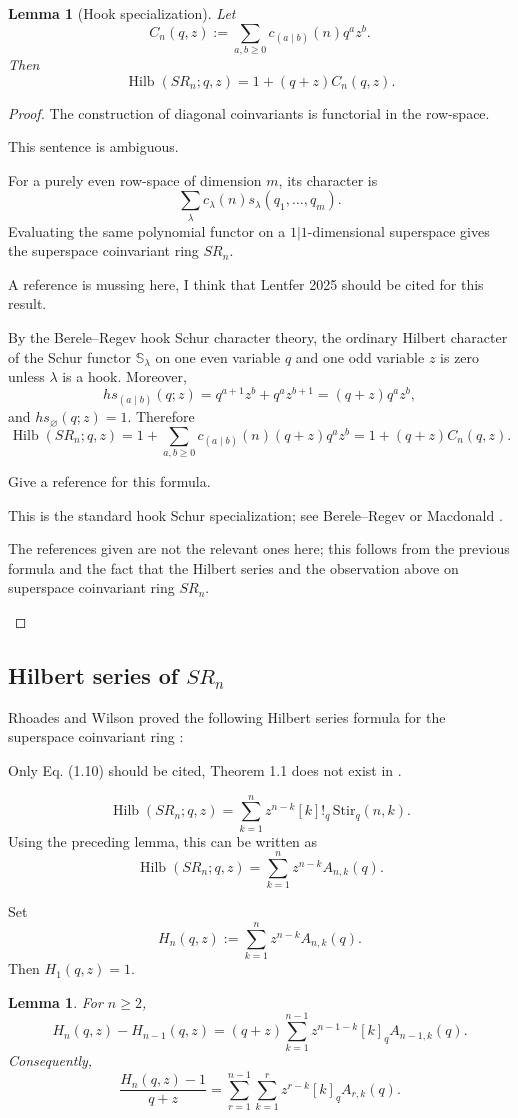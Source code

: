 \documentclass[12pt]{article}
\newtheorem{lemma}[theorem]{Lemma}
\DeclareMathOperator{\Hilb}{Hilb}
\newcommand{\review}[1]{\begin{reviewbox}#1\end{reviewbox}}
\begin{document}
\begin{lemma}[Hook specialization]
Let
\[
C_n(q,z):=\sum_{a,b\geq 0} c_{(a\mid b)}(n)q^a z^b.
\]
Then
\[
\Hilb(SR_n;q,z)=1+(q+z)C_n(q,z).
\]
\end{lemma}

\begin{proof}
The construction of diagonal coinvariants is functorial in the row-space. 
\review{This sentence is ambiguous.}
For a
purely even row-space of dimension \(m\), its character is
\[
\sum_\lambda c_\lambda(n)s_\lambda(q_1,\dots,q_m).
\]
Evaluating the same polynomial functor on a \(1|1\)-dimensional superspace gives
the superspace coinvariant ring \(SR_n\). 
\review{A reference is mussing here, I think that Lentfer 2025 should be cited for this result.}
By the Berele--Regev hook Schur
character theory, the ordinary Hilbert character of the Schur functor
\(\mathbb S_\lambda\) on one even variable \(q\) and one odd variable \(z\) is zero
unless \(\lambda\) is a hook. Moreover,
\[
hs_{(a\mid b)}(q;z)=q^{a+1}z^b+q^a z^{b+1}=(q+z)q^a z^b,
\]
and \(hs_\varnothing(q;z)=1\). Therefore
\[
\Hilb(SR_n;q,z)
=
1+\sum_{a,b\geq 0}c_{(a\mid b)}(n)(q+z)q^a z^b
=
1+(q+z)C_n(q,z).
\]
\review{Give a reference for this formula.}
This is the standard hook Schur specialization; see Berele--Regev
\cite{BereleRegev} or Macdonald \cite[Ch.~I, \S3, Ex.~23]{Macdonald}.
\review{The references given are not the relevant ones here; this follows from the previous formula and the fact that the Hilbert series and the observation above on superspace coinvariant ring $SR_n$.}
\end{proof}

\subsection{Hilbert series of \(SR_n\)}

Rhoades and Wilson proved the following Hilbert series formula for the superspace
coinvariant ring \cite[Theorem~1.1 and Eq.~(1.10)]{RhoadesWilson}:
\review{Only Eq. (1.10) should be cited, Theorem 1.1 does not exist in \cite{RhoadesWilson}.}
\[
\Hilb(SR_n;q,z)=
\sum_{k=1}^{n} z^{n-k}[k]!_q\,\mathrm{Stir}_q(n,k).
\]
Using the preceding lemma, this can be written as
\[
\Hilb(SR_n;q,z)=
\sum_{k=1}^{n}z^{n-k}A_{n,k}(q).
\]

Set
\[
H_n(q,z):=\sum_{k=1}^{n}z^{n-k}A_{n,k}(q).
\]
Then \(H_1(q,z)=1\).

\begin{lemma}
For \(n\geq 2\),
\[
H_n(q,z)-H_{n-1}(q,z)
=
(q+z)\sum_{k=1}^{n-1} z^{n-1-k}[k]_q A_{n-1,k}(q).
\]
Consequently,
\[
\frac{H_n(q,z)-1}{q+z}
=
\sum_{r=1}^{n-1}\sum_{k=1}^{r}
z^{r-k}[k]_q A_{r,k}(q).
\]
\end{lemma}
\end{document}
